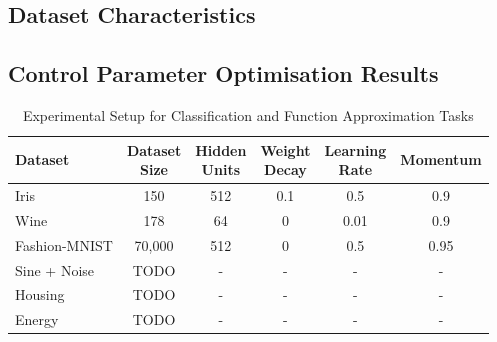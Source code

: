 \documentclass[10pt, conference]{IEEEtran}
\begin{document}
\subsection{Dataset Characteristics}

\subsection{Control Parameter Optimisation Results}
\begin{table}[htbp]
	\centering
	\caption{Experimental Setup for Classification and Function Approximation Tasks}
	\begin{tabular}{|l|c|c|c|c|c|}
		\hline
		\textbf{Dataset} & \makecell{\textbf{Dataset} \\ \textbf{Size}} & \makecell{\textbf{Hidden} \\ \textbf{Units}} & \makecell{\textbf{Weight} \\ \textbf{Decay}} & \makecell{\textbf{Learning} \\ \textbf{Rate}} & \textbf{Momentum} \\
		\hline
		Iris & 150 & 512 & 0.1 & 0.5 & 0.9 \\
		Wine & 178 & 64 & 0 & 0.01 & 0.9 \\
		Fashion-MNIST & 70,000 & 512 & 0 & 0.5 & 0.95 \\
		\hline
		Sine + Noise & TODO & - & - & - & - \\
		Housing & TODO & - & - & - & - \\
		Energy & TODO & - & - & - & - \\
		\hline
	\end{tabular}
	\label{tab:datasets}
\end{table}
\end{document}
